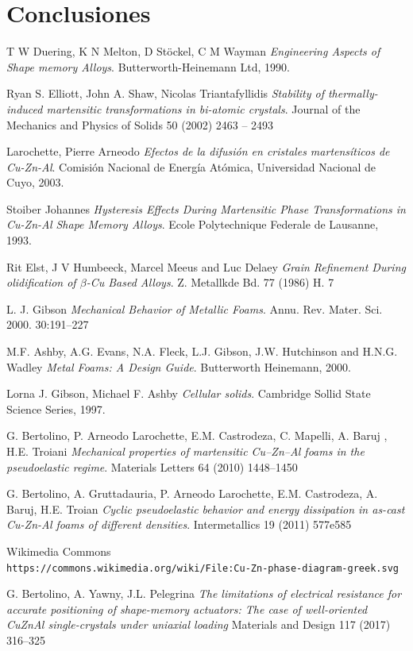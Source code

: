 \documentclass[a4paper,12pt,fleqn,twoside,openany]{book}
\begin{document}
\chapter{Conclusiones}


\begin{thebibliography}{3}

T W Duering, K N Melton, D St{\"o}ckel, C M Wayman 
\textit{Engineering Aspects of Shape memory Alloys}. 
Butterworth-Heinemann Ltd, 1990.
 
Ryan S. Elliott, John A. Shaw, Nicolas Triantafyllidis
\textit{Stability of thermally-induced martensitic
transformations in bi-atomic crystals}.
Journal of the Mechanics and Physics of Solids
50 (2002) 2463 – 2493

Larochette, Pierre Arneodo 
\textit{Efectos de la difusión en cristales martensíticos de Cu-Zn-Al}. 
Comisión Nacional de Energía Atómica, Universidad Nacional de Cuyo, 2003.

Stoiber Johannes 
\textit{Hysteresis Effects During Martensitic Phase Transformations in Cu-Zn-Al Shape Memory Alloys}. 
Ecole Polytechnique Federale de Lausanne, 1993.

Rit Elst, J V Humbeeck, Marcel Meeus and Luc Delaey
\textit{Grain Refinement During olidification of $\beta$-Cu Based Alloys}.
Z. Metallkde Bd. 77 (1986) H. 7

L. J. Gibson
\textit{Mechanical Behavior of Metallic Foams}.
Annu. Rev. Mater. Sci. 2000. 30:191–227

M.F. Ashby, A.G. Evans, N.A. Fleck, L.J. Gibson,
J.W. Hutchinson and H.N.G. Wadley
\textit{Metal Foams: A Design Guide}. 
Butterworth Heinemann, 2000.


Lorna J. Gibson, Michael F. Ashby  
\textit{Cellular solids}. 
Cambridge Sollid State Science Series, 1997.

G. Bertolino, P. Arneodo Larochette, E.M. Castrodeza, C. Mapelli, A. Baruj , H.E. Troiani
\textit{Mechanical properties of martensitic Cu–Zn–Al foams in the pseudoelastic regime}.
Materials Letters 64 (2010) 1448–1450

G. Bertolino, A. Gruttadauria, P. Arneodo Larochette, E.M. Castrodeza, A. Baruj, H.E. Troian
\textit{Cyclic pseudoelastic behavior and energy dissipation in as-cast Cu-Zn-Al foams of
different densities}.
Intermetallics 19 (2011) 577e585

Wikimedia Commons
\\\texttt{https://commons.wikimedia.org/wiki/File:Cu-Zn-phase-diagram-greek.svg}


G. Bertolino, A. Yawny, J.L. Pelegrina
\textit{The limitations of electrical resistance for accurate positioning of
shape-memory actuators: The case of well-oriented CuZnAl
single-crystals under uniaxial loading}
Materials and Design 117 (2017) 316–325
\end{thebibliography}
\end{document}
